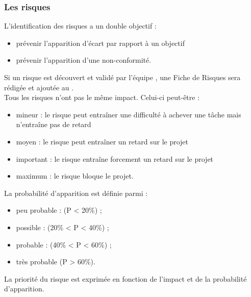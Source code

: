 \subsubsection*{Les risques}

L'identification des risques a un double objectif : 
\begin{itemize}
\item prévenir l'apparition d'écart par rapport à un objectif 
\item prévenir l'apparition d'une non-conformité. \\
\end{itemize}
Si un risque est découvert et validé par l'équipe \PICCourt{}, une Fiche de Risques sera rédigée et ajoutée au \PR.\\

Tous les risques n'ont pas le même impact. Celui-ci peut-être :
\begin{itemize}
\item mineur : le risque peut entraîner une difficulté à achever une tâche mais n'entraîne pas de retard 
\item moyen : le risque peut entraîner un retard sur le projet 
\item important : le risque entraîne forcement un retard sur le projet 
\item maximum : le risque bloque le projet.\\
\end{itemize}

La probabilité d'apparition est définie parmi :
\begin{itemize}
 \item peu probable : (P < 20\%) ;
 \item possible : (20\% < P < 40\%) ;
 \item probable : (40\% < P < 60\%) ;
 \item très probable (P > 60\%).\\
\end{itemize}

La priorité du risque est exprimée en fonction de l'impact et de la probabilité d'apparition. \\

